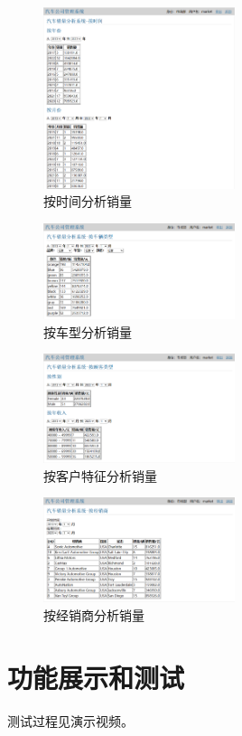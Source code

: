 \documentclass[hyperref,a4paper,UTF8]{ctexart}
\begin{document}
\begin{figure}[h]
    \centering
    \includegraphics[width=0.5\textwidth]{figures/按时间分析销量.png}
    \caption{按时间分析销量}
    \label{fig:按时间分析销量}
\end{figure}

\begin{figure}[h]
    \centering
    \includegraphics[width=0.5\textwidth]{figures/按车型分析销量.png}
    \caption{按车型分析销量}
    \label{fig:按车型分析销量}
\end{figure}

\begin{figure}[h]
    \centering
    \includegraphics[width=0.5\textwidth]{figures/按客户特征分析销量.png}
    \caption{按客户特征分析销量}
    \label{fig:按客户特征分析销量}
\end{figure}

\begin{figure}[h]
    \centering
    \includegraphics[width=0.5\textwidth]{figures/按经销商分析销量.png}
    \caption{按经销商分析销量}
    \label{fig:按经销商分析销量}
\end{figure}

\section{功能展示和测试\label{sec:功能展示和测试}}

测试过程见演示视频。
\end{document}
